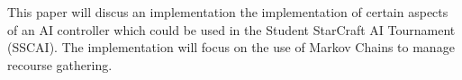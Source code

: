This paper will discus an implementation the implementation of certain aspects of an AI controller which could be used in the Student StarCraft AI Tournament (SSCAI).\cite{sscai} The implementation will focus on the use of Markov Chains to manage recourse gathering.